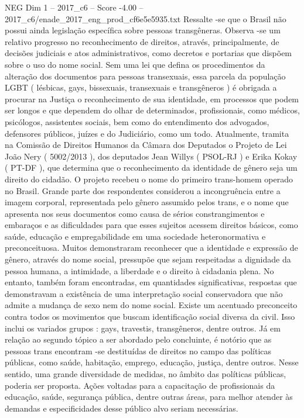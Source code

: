 \begin{textsample}{NEG Dim 1 – 2017\_c6 – Score -4.00 – 2017\_c6/enade\_2017\_eng\_prod\_cf6e5e5935.txt}
Ressalte -se que o Brasil não possui ainda legislação específica sobre pessoas transgêneras.
Observa -se um relativo progresso no reconhecimento de direitos, através, principalmente, de decisões judiciais e atos administrativos, como decretos e portarias que dispõem sobre o uso do nome social.
Sem uma lei que defina os procedimentos da alteração dos documentos para pessoas transexuais, essa parcela da população LGBT ( lésbicas, gays, bissexuais, transexuais e transgêneros ) é obrigada a procurar na Justiça o reconhecimento de sua identidade, em processos que podem ser longos e que dependem do olhar de determinados, profissionais, como médicos, psicólogos, assistentes sociais, bem como do entendimento dos advogados, defensores públicos, juízes e do Judiciário, como um todo.
Atualmente, tramita na Comissão de Direitos Humanos da Câmara dos Deputados o Projeto de Lei João Nery ( 5002/2013 ), dos deputados Jean Willys ( PSOL-RJ ) e Erika Kokay ( PT-DF ), que determina que o reconhecimento da identidade de gênero seja um direito do cidadão.
O projeto recebeu o nome do primeiro trans-homem operado no Brasil.
Grande parte dos respondentes considerou a incongruência entre a imagem corporal, representada pelo gênero assumido pelos trans, e o nome que apresenta nos seus documentos como causa de sérios constrangimentos e embaraços e as dificuldades para que esses sujeitos acessem direitos básicos, como saúde, educação e empregabilidade em uma sociedade heteronormativa e preconceituosa.
Muitos demonstraram reconhecer que a identidade e expressão de gênero, através do nome social, pressupõe que sejam respeitadas a dignidade da pessoa humana, a intimidade, a liberdade e o direito à cidadania plena.
No entanto, também foram encontradas, em quantidades significativas, respostas que demonstravam a existência de uma interpretação social conservadora que não admite a mudança de sexo nem do nome social.
Existe um acentuado preconceito contra todos os movimentos que buscam identificação social diversa da civil.
Isso inclui os variados grupos : gays, travestis, transgêneros, dentre outros.
Já em relação ao segundo tópico a ser abordado pelo concluinte, é notório que as pessoas trans encontram -se destituídas de direitos no campo das políticas públicas, como saúde, habitação, emprego, educação, justiça, dentre outros.
Nesse sentido, uma grande diversidade de medidas, no âmbito das políticas públicas, poderia ser proposta.
Ações voltadas para a capacitação de profissionais da educação, saúde, segurança pública, dentre outras áreas, para melhor atender às demandas e especificidades desse público alvo seriam necessárias.

\end{textsample}
